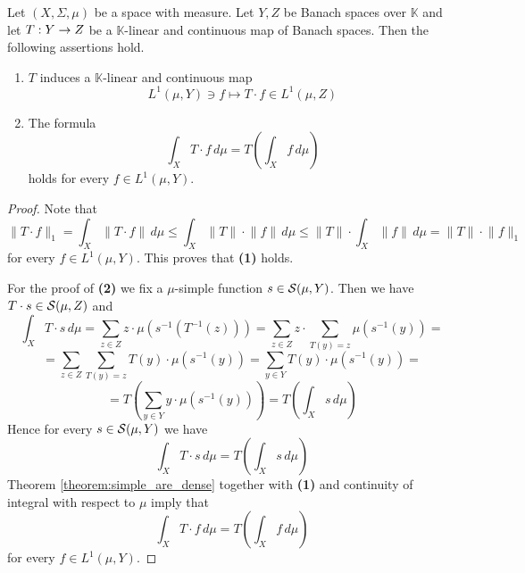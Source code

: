 \begin{proposition}\label{proposition:Bochner_integral_commutes_with_any_continuous_linear_operation}
    Let $(X,\Sigma,\mu)$ be a space with measure. Let $Y, Z$ be Banach spaces over $\mathbb{K}$ and let $T:Y \rightarrow Z$ be a $\mathbb{K}$-linear and continuous map of Banach spaces. Then the following assertions hold.
    \begin{enumerate}[label=\emph{\textbf{(\arabic*)}}, leftmargin=*]
        \item $T$ induces a $\mathbb{K}$-linear and continuous map 
        $$L^1(\mu,Y) \ni f \mapsto T \cdot f \in L^1(\mu,Z)$$
        \item The formula 
        $$\int_X T\cdot f \,d\mu = T\left(\int_X f\,d\mu\right)$$
        holds for every $f \in L^1(\mu,Y)$.
    \end{enumerate}
\end{proposition}
\begin{proof}
    Note that
    $$\lVert T\cdot f \rVert_1 = \int_X\lVert T\cdot f \rVert\,d\mu \leq \int_X \lVert T\rVert\cdot \lVert f \rVert\,d\mu \leq \lVert T\rVert\cdot \int_X  \lVert f \rVert\,d\mu = \lVert T\rVert\cdot \lVert f \rVert_1$$
    for every $f \in L^1(\mu,Y)$. This proves that \textbf{(1)} holds.

    For the proof of \textbf{(2)} we fix a $\mu$-simple function $s \in {\mathcal S}(\mu,Y)$. Then we have $T\cdot s \in {\mathcal S}(\mu,Z)$ and
    $$\int_X T\cdot s\,d\mu = \sum_{z \in Z}z \cdot \mu\left(s^{-1}\left(T^{-1}(z)\right)\right) = \sum_{z\in Z}z\cdot \sum_{T(y) = z}\mu\left(s^{-1}(y)\right) = $$
    $$= \sum_{z \in Z}\sum_{T(y) = z}T(y)\cdot \mu\left(s^{-1}(y)\right) = \sum_{y\in Y} T(y)\cdot \mu\left(s^{-1}(y)\right) = $$
    $$=T\left( \sum_{y\in Y} y\cdot \mu\left(s^{-1}(y)\right) \right) = T\left( \int_X s\,d\mu\right)$$
    Hence for every $s \in {\mathcal S}(\mu,Y)$ we have 
    $$\int_X T\cdot s \,d\mu = T\left(\int_X s\,d\mu\right)$$
    Theorem \ref{theorem:simple_are_dense} together with \textbf{(1)} and continuity of integral with respect to $\mu$ imply that
    $$\int_X T\cdot f \,d\mu = T\left(\int_X f\,d\mu\right)$$
    for every $f \in L^1(\mu,Y)$.
\end{proof}

